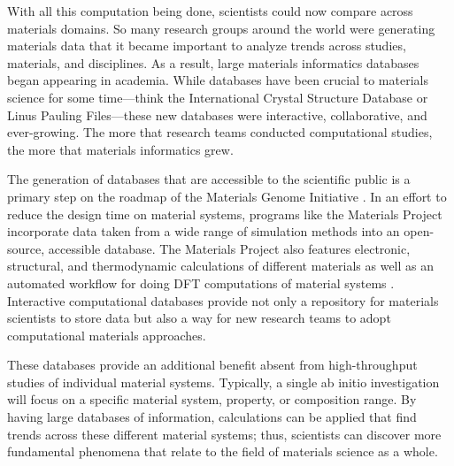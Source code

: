 With all this computation being done, scientists could now compare across materials domains. So many research groups around the world were generating materials data that it became important to analyze trends across studies, materials, and disciplines. As a result, large materials informatics databases began appearing in academia. While databases have been crucial to materials science for some time---think the International Crystal Structure Database or Linus Pauling Files---these new databases were interactive, collaborative, and ever-growing. The more that research teams conducted computational studies, the more that materials informatics grew.

The generation of databases that are accessible to the scientific public is a primary step on the roadmap of the Materials Genome Initiative \cite{DePablo2014}. In an effort to reduce the design time on material systems, programs like the Materials Project incorporate data taken from a wide range of simulation methods into an open-source, accessible database. The Materials Project also features electronic, structural, and thermodynamic calculations of different materials as well as an automated workflow for doing DFT computations of material systems \cite{Jain2013}. Interactive computational databases provide not only a repository for materials scientists to store data but also a way for new research teams to adopt computational materials approaches. 

These databases provide an additional benefit absent from high-throughput studies of individual material systems. Typically, a single ab initio investigation will focus on a specific material system, property, or composition range. By having large databases of information, calculations can be applied that find trends across these different material systems; thus, scientists can discover more fundamental phenomena that relate to the field of materials science as a whole. 

